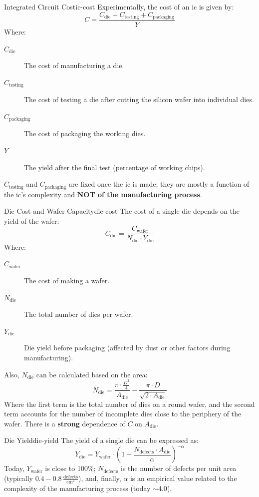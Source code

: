 \begin{definition}{Integrated Circuit Cost}{ic-cost}
    Experimentally, the cost of an \gls{ic} is given by:
    \[
        C = \frac{C_{\text{die}} + C_{\text{testing}} + C_{\text{packaging}}}{Y}
    \]
    Where:
    \begin{description}
        \item[\(C_{\text{die}}\)] The cost of manufacturing a die.
        \item[\(C_{\text{testing}}\)] The cost of testing a die after cutting the silicon wafer into individual dies.
        \item[\(C_{\text{packaging}}\)] The cost of packaging the working dies.
        \item[\(Y\)] The yield after the final test (percentage of working chips).
    \end{description}
    \(C_{\text{testing}}\) and \(C_{\text{packaging}}\) are fixed once the \gls{ic} is made; they are mostly a function of the \gls{ic}'s complexity and \textbf{NOT of the manufacturing process}.
\end{definition}

\begin{definition}{Die Cost and Wafer Capacity}{die-cost}
    The cost of a single die depends on the yield of the wafer:
    \[
        C_{\text{die}} = \frac{C_{\text{wafer}}}{N_{\text{die}} \cdot Y_{\text{die}}}
    \]
    Where:
    \begin{description}
        \item[\(C_{\text{wafer}}\)] The cost of making a wafer.
        \item[\(N_{\text{die}}\)] The total number of dies per wafer.
        \item[\(Y_{\text{die}}\)] Die yield before packaging (affected by dust or other factors during manufacturing).
    \end{description}
    Also, \(N_{\text{die}}\) can be calculated based on the area:
    \[
        N_{\text{die}} = \frac{\pi \cdot \frac{D^2}{4}}{A_{\text{die}}} - \frac{\pi \cdot D}{\sqrt{2 \cdot A_{\text{die}}}}
    \]
    Where the first term is the total number of dies on a round wafer, and the second term accounts for the number of incomplete dies close to the periphery of the wafer. There is a \textbf{strong} dependence of \(C\) on \(A_{\text{die}}\).
\end{definition}

\begin{definition}{Die Yield}{die-yield}
    The yield of a single die can be expressed as:
    \[
        Y_{\text{die}} = Y_{\text{wafer}} \cdot \left(1 + \frac{N_{\text{defects}} \cdot A_{\text{die}}}{\alpha}\right)^{-\alpha}
    \]
    Today, \(Y_{\text{wafer}}\) is close to 100\%; \(N_{\text{defects}}\) is the number of defects per unit area (typically \(0.4-0.8 \, \frac{\text{defects}}{\text{cm}^2}\)), and, finally, \(\alpha\) is an empirical value related to the complexity of the manufacturing process (today \(\sim 4.0\)).
\end{definition}

